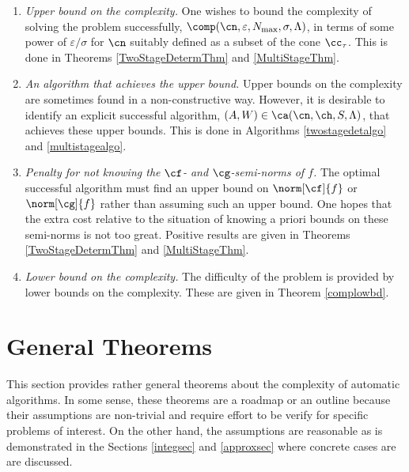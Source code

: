\documentclass[]{elsarticle}
\theoremstyle{definition}
\theoremstyle{remark}
\begin{document}
\begin{enumerate}

\renewcommand{\labelenumi}{\roman{enumi}.}

\item \emph{Upper bound on the complexity.}
One wishes to bound the complexity of solving the problem successfully, $\comp(\cn,\varepsilon,N_{\max},\sigma,\Lambda)$, in terms of some power of $\varepsilon/\sigma$ for $\cn$ suitably defined as a subset of the cone $\cc_{\tau}$.  This is done in Theorems \ref{TwoStageDetermThm} and \ref{MultiStageThm}.

\item \emph{An algorithm that achieves the upper bound.}  Upper bounds on the complexity are sometimes found in a non-constructive way.  However, it is desirable to identify an explicit successful algorithm, $(A,W) \in \ca(\cn,\ch,S,\Lambda)$, that achieves these upper bounds.  This is done in Algorithms \ref{twostagedetalgo} and \ref{multistagealgo}.

\item \emph{Penalty for not knowing the $\cf$- and $\cg$-semi-norms of $f$.} The optimal successful algorithm must find an upper bound on $\norm[\cf]{f}$ or $\norm[\cg]{f}$ rather than assuming such an upper bound.  One hopes that the extra cost relative to the situation of knowing a priori bounds on these semi-norms is not too great.  Positive results are given in Theorems \ref{TwoStageDetermThm} and \ref{MultiStageThm}.

\item \emph{Lower bound on the complexity.}  The difficulty of the problem is provided by lower bounds on the complexity.  These are given in Theorem \ref{complowbd}.

\end{enumerate}

\section{General Theorems} \label{genthmsec}

This section provides rather general theorems about the complexity of automatic algorithms.  In some sense, these theorems are a roadmap or an outline because their assumptions are non-trivial and require effort to be verify for specific problems of interest.  On the other hand, the assumptions are reasonable as is demonstrated in the Sections \ref{integsec} and \ref{approxsec} where concrete cases are are discussed.  
\end{document}
